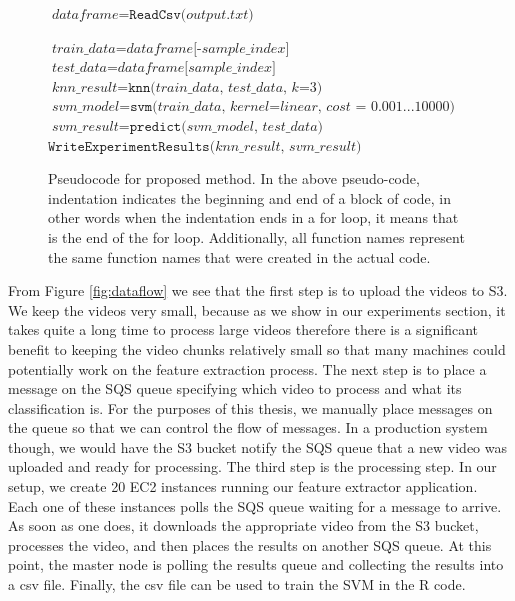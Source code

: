 \begin{figure}[h]
\begin{algorithmic}[1]
  \State $\textit{dataframe} = \texttt{ReadCsv(} \textit{output.txt} \texttt{)}$


   
    \State $\textit{train\_data} = \textit{dataframe[-sample\_index]}$
    \State $\textit{test\_data} = \textit{dataframe[sample\_index]}$
    \State $\textit{knn\_result} = \texttt{knn(}\textit{train\_data, test\_data, k=3} \texttt{)}$
    \State $\textit{svm\_model} = \texttt{svm(}\textit{train\_data, kernel=linear, cost = 0.001...10000} \textit{)}$
    \State $\textit{svm\_result} = \texttt{predict(} \textit{svm\_model, test\_data} \texttt{)}$
  \EndFor
  \State $\texttt{WriteExperimentResults(} \textit{knn\_result, svm\_result} \texttt{)}$

\end{algorithmic}

\caption{Pseudocode for proposed method. In the above pseudo-code, indentation
indicates the beginning and end of a block of code, in other words when the
indentation ends in a for loop, it means that is the end of the for loop. Additionally,
all function names represent the same function names that were created in the actual
code.}
\label{alg:vida_pseudo_code}

\end{figure}

\FloatBarrier

From Figure \ref{fig:dataflow} we see that the first step is to upload
the videos to S3. We keep the videos very small, because as we show in our experiments
section, it takes quite a long time to process large videos therefore there is a
significant benefit to keeping the video chunks relatively small so that many
machines could potentially work on the feature extraction process. The next step
is to place a message on the SQS queue specifying which video to process and
what its classification is. For the purposes of this thesis, we manually place
messages on the queue so that we can control the flow of messages. In
a production system though, we would have the S3 bucket notify the SQS queue that
a new video was uploaded and ready for processing. The third step is the processing
step. In our setup, we create 20 EC2 instances running our feature extractor application.
Each one of these instances polls the SQS queue waiting for a message to arrive.
As soon as one does, it downloads the appropriate video from the S3 bucket,
processes the video, and then places the results on another SQS queue. At this
point, the master node is polling the results queue and collecting the results
into a csv file. Finally, the csv file can be used to train the SVM in the R
code.

